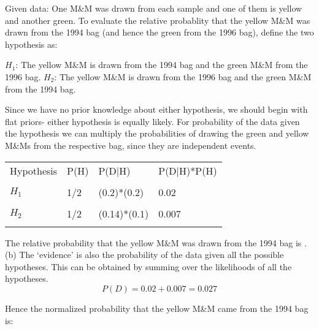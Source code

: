\documentclass[12pt,usletter,english]{article}
\begin{document}
Given data: One M\&M was drawn from each sample and one of them is
yellow and another green. To evaluate the relative probablity that the
yellow M\&M was drawn from the 1994 bag (and hence the green from the
1996 bag), define the two hypothesis as:

\noindent$H_1$: The yellow M\&M is drawn from the 1994 bag and the green M\&M from the
1996 bag.
\noindent$H_2$: The yellow M\&M is drawn from the 1996 bag and the green M\&M from the
1994 bag.

Since we have no prior knowledge about either hypothesis, we should
begin with flat priors- either hypothesis is equally likely. For
probability of the data given the hypothesis we can multiply the
probabilities of drawing the green and yellow M\&Ms from the
respective bag, since they are independent events.

\begin{center}
\begin{tabular}{|l|l|l|l|}
\hline
Hypothesis & P(H) & P(D$|$H) & P(D$|$H)*P(H) \\
 & & & \\
\hline
$H_1$ & 1/2 & (0.2)*(0.2) & 0.02 \\
 & & & \\
\hline
$H_2$ & 1/2 & (0.14)*(0.1) & 0.007 \\
 & & & \\
\hline
\end{tabular}
\end{center}

The relative probability that the yellow M\&M was drawn from the 1994
bag is .\\

\noindent(b) The `evidence' is also the probability of the data given all the
possible hypotheses. This can be obtained by summing over the
likelihoods of all the hypotheses.
\begin{equation}
  P(D) = 0.02+0.007 = 0.027
\end{equation}

\noindent Hence the normalized probability that the yellow M\&M came from the
1994 bag is:
\end{document}
